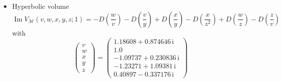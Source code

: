 \documentclass[12pt,reqno]{amsart}
\numberwithin{equation}{section}
\renewcommand{\Im}{\operatorname{Im}}
\newcommand{\I}{\mathrm{i}}
\begin{document}
\begin{itemize}
\item Hyperbolic volume
  \begin{equation*}
    \Im V_{\mathcal{M}}(v,w,x,y,z; 1)
    =
    -D\left(\frac{w}{v}\right)
    - D\left(\frac{ v}{y} \right)
    + D\left(\frac{x}{y}\right)
    - D\left(\frac{x}{z^2} \right)
    + D\left(\frac{w}{z}\right)
    - D\left(\frac{z}{ v} \right)
  \end{equation*}
  with
  \begin{equation*}
    \begin{pmatrix}
      v \\ w\\ x\\ y \\ z
    \end{pmatrix}
    =
    \begin{pmatrix}
      1.18608 + 0.874646 \, \I
      \\
      1.0 
      \\
      -1.09737 + 0.230836 \, \I
      \\
      -1.23271 +   1.09381 \, \I
      \\
      0.40897 - 0.337176 \, \I
    \end{pmatrix}
  \end{equation*}


\end{itemize}
\end{document}
